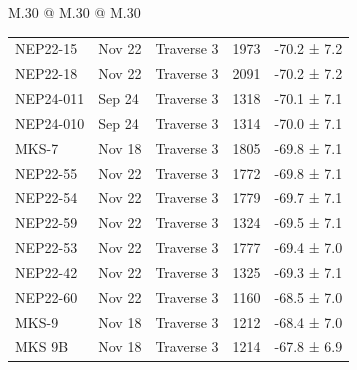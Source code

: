 \begin{landscape}
\begin{table}
\begin{tabular}{M{.30\textwidth} @{\hspace{4cm}} M{.30\textwidth} @{\hspace{4cm}} M{.30\textwidth}}
\begin{tabular}{l l l l l}
    NEP22-15 & Nov 22 & Traverse 3 & 1973 & -70.2 ±  7.2 \\
    NEP22-18 & Nov 22 & Traverse 3 & 2091 & -70.2 ±  7.2 \\
    NEP24-011 & Sep 24 & Traverse 3 & 1318 & -70.1 ±  7.1 \\
    NEP24-010 & Sep 24 & Traverse 3 & 1314 & -70.0 ±  7.1 \\
    MKS-7 & Nov 18 & Traverse 3 & 1805 & -69.8 ±  7.1 \\
    NEP22-55 & Nov 22 & Traverse 3 & 1772 & -69.8 ±  7.1 \\
    NEP22-54 & Nov 22 & Traverse 3 & 1779 & -69.7 ±  7.1 \\
    NEP22-59 & Nov 22 & Traverse 3 & 1324 & -69.5 ±  7.1 \\
    NEP22-53 & Nov 22 & Traverse 3 & 1777 & -69.4 ±  7.0 \\
    NEP22-42 & Nov 22 & Traverse 3 & 1325 & -69.3 ±  7.1 \\
    NEP22-60 & Nov 22 & Traverse 3 & 1160 & -68.5 ±  7.0 \\
    MKS-9 & Nov 18 & Traverse 3 & 1212 & -68.4 ±  7.0 \\
    MKS 9B & Nov 18 & Traverse 3 & 1214 & -67.8 ±  6.9 \\
    \hline
        \end{tabular}\\ %
    \end{tabular}
\end{table}
\end{landscape}

   \newpage

